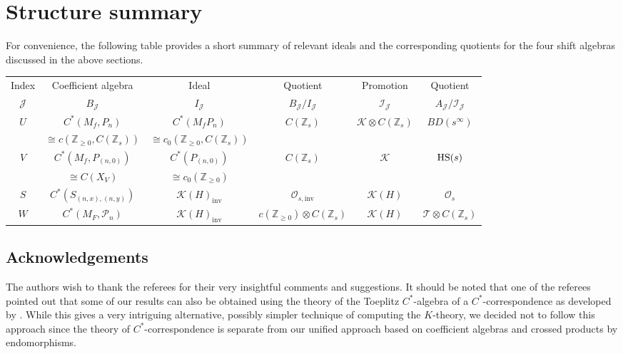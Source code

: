 \documentclass[pdftex]{sigma}
\newcommand{\Z}{{\mathbb Z}}
\newcommand{\kcal}{{\mathcal K}}
\newcommand{\pcal}{{\mathcal P}}
\numberwithin{equation}{section}
\begin{document}
\section{Structure summary}
For convenience, the following table provides a short summary of relevant ideals and the corresponding quotients for the four shift algebras discussed in the above sections.

\begin{center}
\begin{tabular}{c||c|c|c|c|c}\renewcommand{\arraystretch}{1.3}
Index & Coefficient algebra & Ideal & Quotient & Promotion & Quotient \\
$\mathcal{J}$ & $B_\mathcal{J}$& $I_\mathcal{J}$ & $B_\mathcal{J}/I_\mathcal{J}$ & $\mathcal{I}_\mathcal{J}$ & $A_\mathcal{J}/\mathcal{I}_\mathcal{J}$ \\
\hline
\hline
$U$ & $C^*(M_f,P_n)$ & $C^*(M_fP_n)$ & $C(\Z_s)$ & $\kcal \otimes C(\Z_s)$ & $BD(s^
\infty)$ \\
& $\cong c(\Z_{\ge 0},C(\Z_s))$ & $\cong c_0(\Z_{\ge 0},C(\Z_s))$ & & & \\
\hline
$V$ & $C^*(M_f,P_{(n,0)})$ & $C^*(P_{(n,0)})$ & $C(\Z_s)$ & $\kcal$ & ${\rm HS}(s)$ \\
& $\cong C(X_V)$ & $\cong c_0(\Z_{\ge 0})$ & & & \\
\hline
$S$ & $C^*(S_{(n,x),(n,y)})$ & $\kcal(H)_{\mathrm{inv}}$ & $\mathcal{O}_{s,\mathrm{inv}}$ & $\kcal(H)$ & $\mathcal{O}_s$ \\
\hline
$W$ & $C^*(M_F,\pcal_n)$ & $\kcal(H)_{\mathrm{inv}}$ & $c(\Z_{\ge 0})\otimes C(\Z_s)$ & $\kcal(H)$ & $\mathcal{T}\otimes C(\Z_s)$
\end{tabular}
\end{center}

\subsection*{Acknowledgements}

The authors wish to thank the referees for their very insightful comments and suggestions. It should be noted that one of the referees pointed out that some of our results can also be obtained using the theory of the Toeplitz $C^*$-algebra of a $C^*$-correspondence as developed by \cite{Pim}. While this gives a very intriguing alternative, possibly simpler technique of computing the $K$-theory, we decided not to follow this approach since the theory of $C^*$-correspondence is separate from our unified approach based on coefficient algebras and crossed products by endomorphisms.
\end{document}
